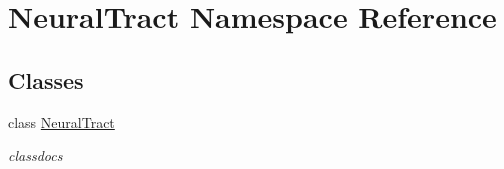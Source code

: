 \hypertarget{namespace_neural_tract}{\section{Neural\-Tract Namespace Reference}
\label{namespace_neural_tract}
}
\subsection*{Classes}
\begin{DoxyCompactItemize}
\item 
class \hyperlink{class_neural_tract_1_1_neural_tract}{Neural\-Tract}
\begin{DoxyCompactList}\small\item\em classdocs \end{DoxyCompactList}\end{DoxyCompactItemize}
